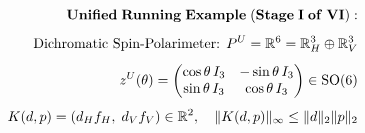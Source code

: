 \documentclass[preview]{standalone}
\begin{document}
\begin{align*}
\special{dvisvgm:raw <g id='unique000'>}\mathbf{Unified\;Running\;Example\;(Stage\;I\;of\;VI):}\\[4pt]\text{Dichromatic Spin-Polarimeter: }P^U = \mathbb{R}^6 = \mathbb{R}_H^3 \oplus \mathbb{R}_V^3\\[4pt]z^U(\theta) = \begin{pmatrix} \cos\theta\,I_3 & -\sin\theta\,I_3 \\ \sin\theta\,I_3 & \cos\theta\,I_3 \end{pmatrix} \in \mathrm{SO}(6)\\[4pt]K(d, p) = (d_H f_H,\; d_V f_V) \in \mathbb{R}^2,\quad \|K(d,p)\|_\infty \le \|d\|_2\|p\|_2\special{dvisvgm:raw </g>}
\end{align*}
\end{document}
